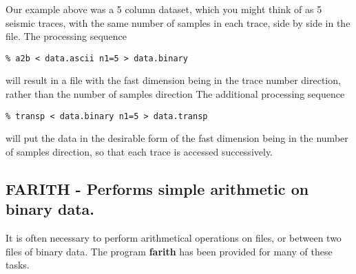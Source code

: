 {{{Our example above was a 5 column dataset, which you might think
of as  5 seismic traces, with the same number of samples in each
trace, side by side in the file. The processing
sequence
{\small\begin{verbatim}
% a2b < data.ascii n1=5 > data.binary 
\end{verbatim}}\noindent
will result in a file with the fast dimension being in the 
trace number direction, rather than the number of samples direction
The additional processing sequence
{\small\begin{verbatim}
% transp < data.binary n1=5 > data.transp
\end{verbatim}}\noindent
will put the data in the desirable form of the fast dimension being
in the number of samples direction, so that each trace is accessed
successively.

\subsection{FARITH - Performs simple arithmetic on binary data.}

It is often necessary to perform arithmetical operations on files,
or between two files of binary data. The program {\bf farith\/} has
been provided for many of these tasks.

}}}
